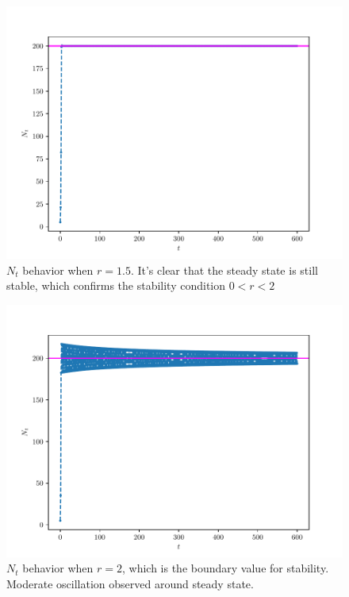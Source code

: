 \begin{homeworkProblem}[4]
\begin{enumerate}
\begin{figure}
\end{figure}
\begin{figure}
    \centering
    \caption{$N_t$ behavior when $r = 1.5$. It's clear that the steady state is
    still stable, which confirms the stability condition $0 < r < 2$}
    \includegraphics[scale=0.6]{fig/fig4(d)(3).pdf}
\end{figure}
\begin{figure}
    \centering
    \caption{$N_t$ behavior when $r = 2$, which is the boundary value for
    stability. Moderate oscillation observed around steady state.}
    \includegraphics[scale=0.6]{fig/fig4(d)(4).pdf}
\end{figure}


\end{enumerate}
\end{homeworkProblem}

